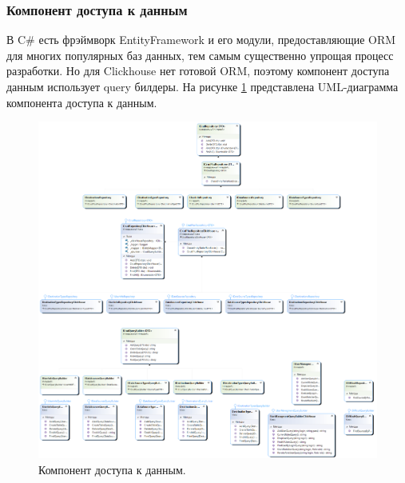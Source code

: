 \subsubsection{Компонент доступа к данным}
В C\# есть фрэймворк EntityFramework и его модули, предоставляющие ORM для многих популярных баз данных, тем самым существенно упрощая процесс разработки. Но для Clickhouse нет готовой ORM, поэтому компонент доступа данным использует query билдеры.
На рисунке \ref{img:AccessToDB} представлена UML-диаграмма компонента доступа к данным.
\begin{figure}[H]
	\centering
	\includegraphics[scale=0.35]{AccessToDB.png}
	\caption{Компонент доступа к данным.}
	\label{img:AccessToDB}
\end{figure}
